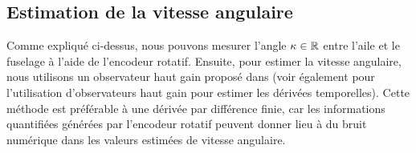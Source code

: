 
\subsection{Estimation de la vitesse angulaire}

Comme expliqué ci-dessus, nous pouvons mesurer l'angle $\kappa \in {\mathbb R}$ entre l'aile et le fuselage à l'aide de l'encodeur rotatif. Ensuite, pour estimer la vitesse angulaire, nous utilisons un observateur haut gain proposé dans \cite{203613} (voir également \cite{1032320} pour l'utilisation d'observateurs haut gain pour estimer les dérivées temporelles). Cette méthode est préférable à une dérivée par différence finie, car les informations quantifiées générées par l'encodeur rotatif peuvent donner lieu à du bruit numérique dans les valeurs estimées de vitesse angulaire.


